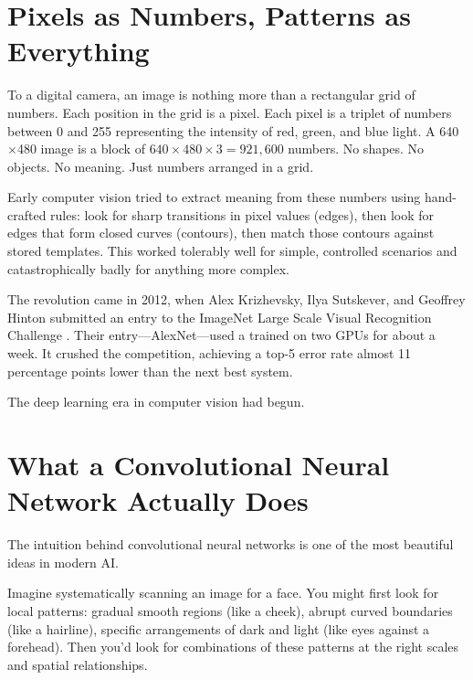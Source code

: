 \section{Pixels as Numbers, Patterns as Everything}
\label{sec:pixels-numbers}

To a digital camera, an image is nothing more than a rectangular grid of numbers. Each position in the grid is a pixel. Each pixel is a triplet of numbers between 0 and 255 representing the intensity of red, green, and blue light. A 640$\times$480 image is a block of $640 \times 480 \times 3 = 921{,}600$ numbers. No shapes. No objects. No meaning. Just numbers arranged in a grid.

Early computer vision tried to extract meaning from these numbers using hand-crafted rules: look for sharp transitions in pixel values (edges), then look for edges that form closed curves (contours), then match those contours against stored templates. This worked tolerably well for simple, controlled scenarios and catastrophically badly for anything more complex.

The revolution came in 2012, when Alex Krizhevsky, Ilya Sutskever, and Geoffrey Hinton submitted an entry to the ImageNet Large Scale Visual Recognition Challenge \autocite{krizhevsky2012imagenet}. Their entry---AlexNet---used a  trained on two GPUs for about a week. It crushed the competition, achieving a top-5 error rate almost 11 percentage points lower than the next best system.

The deep learning era in computer vision had begun.

\section{What a Convolutional Neural Network Actually Does}
\label{sec:cnn-intuition}

The intuition behind convolutional neural networks is one of the most beautiful ideas in modern AI.

Imagine systematically scanning an image for a face. You might first look for local patterns: gradual smooth regions (like a cheek), abrupt curved boundaries (like a hairline), specific arrangements of dark and light (like eyes against a forehead). Then you'd look for combinations of these patterns at the right scales and spatial relationships.

